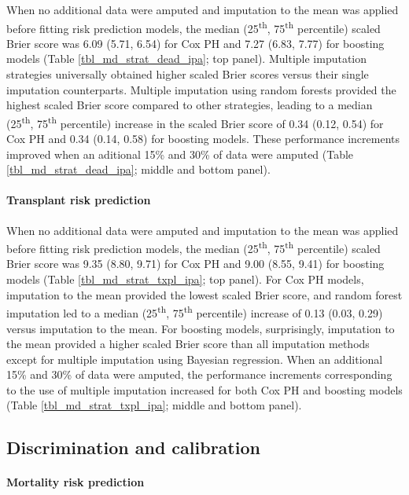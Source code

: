 \documentclass{article}
\begin{document}
When no additional data were amputed and imputation to the mean was
applied before fitting risk prediction models, the median
(25\textsuperscript{th}, 75\textsuperscript{th} percentile) scaled Brier
score was 6.09 (5.71, 6.54) for Cox PH and 7.27 (6.83, 7.77) for
boosting models (Table \ref{tbl_md_strat_dead_ipa}; top panel). Multiple
imputation strategies universally obtained higher scaled Brier scores
versus their single imputation counterparts. Multiple imputation using
random forests provided the highest scaled Brier score compared to other
strategies, leading to a median (25\textsuperscript{th},
75\textsuperscript{th} percentile) increase in the scaled Brier score of
0.34 (0.12, 0.54) for Cox PH and 0.34 (0.14, 0.58) for boosting models.
These performance increments improved when an aditional 15\% and 30\% of
data were amputed (Table \ref{tbl_md_strat_dead_ipa}; middle and bottom
panel).

\paragraph{Transplant risk prediction}

When no additional data were amputed and imputation to the mean was
applied before fitting risk prediction models, the median
(25\textsuperscript{th}, 75\textsuperscript{th} percentile) scaled Brier
score was 9.35 (8.80, 9.71) for Cox PH and 9.00 (8.55, 9.41) for
boosting models (Table \ref{tbl_md_strat_txpl_ipa}; top panel). For Cox
PH models, imputation to the mean provided the lowest scaled Brier
score, and random forest imputation led to a median
(25\textsuperscript{th}, 75\textsuperscript{th} percentile) increase of
0.13 (0.03, 0.29) versus imputation to the mean. For boosting models,
surprisingly, imputation to the mean provided a higher scaled Brier
score than all imputation methods except for multiple imputation using
Bayesian regression. When an additional 15\% and 30\% of data were
amputed, the performance increments corresponding to the use of multiple
imputation increased for both Cox PH and boosting models (Table
\ref{tbl_md_strat_txpl_ipa}; middle and bottom panel).

\hypertarget{discrimination-and-calibration}{%
\subsection{Discrimination and
calibration}\label{discrimination-and-calibration}}

\paragraph{Mortality risk prediction}
\end{document}
